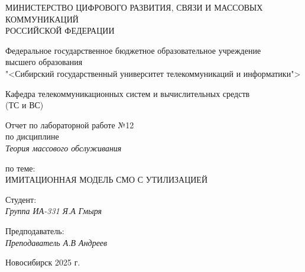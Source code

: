 \thispagestyle{empty}

\begin{center}
    МИНИСТЕРСТВО ЦИФРОВОГО РАЗВИТИЯ, СВЯЗИ И МАССОВЫХ КОММУНИКАЦИЙ \\ РОССИЙСКОЙ ФЕДЕРАЦИИ

    \vspace{20pt}

    Федеральное государственное бюджетное образовательное учреждение  \\  высшего образования \\
    "<Сибирский государственный университет телекоммуникаций и информатики"> \\

    \vspace{20pt}

    Кафедра телекоммуникационных систем и вычислительных средств \\  (ТС и ВС)
\end{center}

\vfill

\begin{center}
    Отчет по лабораторной работе №12 \\  
    по дисциплине \\
    \textit{Теория массового обслуживания}

    \vspace{20pt} 
    по теме: \\
    \uppercase{Имитационная модель СМО с утилизацией}
\end{center}

\vfill

    \noindent Студент: \\
    \textit{Группа ИА-331 \hfill Я.А Гмыря}

    \vspace{20pt}

    \noindent Предподаватель: \\
    \textit{Преподаватель \hfill А.В Андреев}

\vfill

\begin{center}
    Новосибирск 2025 г.
\end{center}